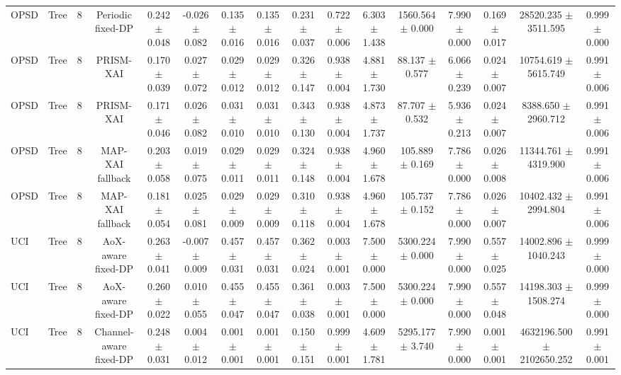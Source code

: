 \begin{tabular}{lccccccccccccccc}
OPSD & Tree & 8 & Periodic fixed-DP & 0.242 $\pm$ 0.048 & -0.026 $\pm$ 0.082 & 0.135 $\pm$ 0.016 & 0.135 $\pm$ 0.016 & 0.231 $\pm$ 0.037 & 0.722 $\pm$ 0.006 & 6.303 $\pm$ 1.438 & 1560.564 $\pm$ 0.000 & 7.990 $\pm$ 0.000 & 0.169 $\pm$ 0.017 & 28520.235 $\pm$ 3511.595 & 0.999 $\pm$ 0.000 \\
OPSD & Tree & 8 & PRISM-XAI & 0.170 $\pm$ 0.039 & 0.027 $\pm$ 0.072 & 0.029 $\pm$ 0.012 & 0.029 $\pm$ 0.012 & 0.326 $\pm$ 0.147 & 0.938 $\pm$ 0.004 & 4.881 $\pm$ 1.730 & 88.137 $\pm$ 0.577 & 6.066 $\pm$ 0.239 & 0.024 $\pm$ 0.007 & 10754.619 $\pm$ 5615.749 & 0.991 $\pm$ 0.006 \\
OPSD & Tree & 8 & PRISM-XAI & 0.171 $\pm$ 0.046 & 0.026 $\pm$ 0.082 & 0.031 $\pm$ 0.010 & 0.031 $\pm$ 0.010 & 0.343 $\pm$ 0.130 & 0.938 $\pm$ 0.004 & 4.873 $\pm$ 1.737 & 87.707 $\pm$ 0.532 & 5.936 $\pm$ 0.213 & 0.024 $\pm$ 0.007 & 8388.650 $\pm$ 2960.712 & 0.991 $\pm$ 0.006 \\
OPSD & Tree & 8 & MAP-XAI fallback & 0.203 $\pm$ 0.058 & 0.019 $\pm$ 0.075 & 0.029 $\pm$ 0.011 & 0.029 $\pm$ 0.011 & 0.324 $\pm$ 0.148 & 0.938 $\pm$ 0.004 & 4.960 $\pm$ 1.678 & 105.889 $\pm$ 0.169 & 7.786 $\pm$ 0.000 & 0.026 $\pm$ 0.008 & 11344.761 $\pm$ 4319.900 & 0.991 $\pm$ 0.006 \\
OPSD & Tree & 8 & MAP-XAI fallback & 0.181 $\pm$ 0.054 & 0.025 $\pm$ 0.081 & 0.029 $\pm$ 0.009 & 0.029 $\pm$ 0.009 & 0.310 $\pm$ 0.118 & 0.938 $\pm$ 0.004 & 4.960 $\pm$ 1.678 & 105.737 $\pm$ 0.152 & 7.786 $\pm$ 0.000 & 0.026 $\pm$ 0.007 & 10402.432 $\pm$ 2994.804 & 0.991 $\pm$ 0.006 \\
UCI & Tree & 8 & AoX-aware fixed-DP & 0.263 $\pm$ 0.041 & -0.007 $\pm$ 0.009 & 0.457 $\pm$ 0.031 & 0.457 $\pm$ 0.031 & 0.362 $\pm$ 0.024 & 0.003 $\pm$ 0.001 & 7.500 $\pm$ 0.000 & 5300.224 $\pm$ 0.000 & 7.990 $\pm$ 0.000 & 0.557 $\pm$ 0.025 & 14002.896 $\pm$ 1040.243 & 0.999 $\pm$ 0.000 \\
UCI & Tree & 8 & AoX-aware fixed-DP & 0.260 $\pm$ 0.022 & 0.010 $\pm$ 0.055 & 0.455 $\pm$ 0.047 & 0.455 $\pm$ 0.047 & 0.361 $\pm$ 0.038 & 0.003 $\pm$ 0.001 & 7.500 $\pm$ 0.000 & 5300.224 $\pm$ 0.000 & 7.990 $\pm$ 0.000 & 0.557 $\pm$ 0.048 & 14198.303 $\pm$ 1508.274 & 0.999 $\pm$ 0.000 \\
UCI & Tree & 8 & Channel-aware fixed-DP & 0.248 $\pm$ 0.031 & 0.004 $\pm$ 0.012 & 0.001 $\pm$ 0.001 & 0.001 $\pm$ 0.001 & 0.150 $\pm$ 0.151 & 0.999 $\pm$ 0.001 & 4.609 $\pm$ 1.781 & 5295.177 $\pm$ 3.740 & 7.990 $\pm$ 0.000 & 0.001 $\pm$ 0.001 & 4632196.500 $\pm$ 2102650.252 & 0.991 $\pm$ 0.001 \\

\end{tabular}
